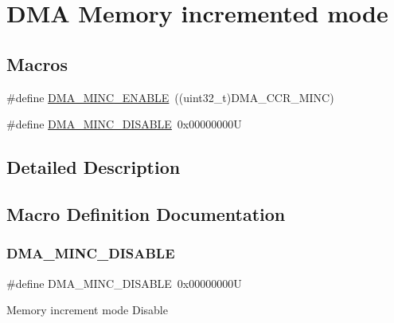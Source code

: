 \hypertarget{group___d_m_a___memory__incremented__mode}{}\section{D\+MA Memory incremented mode}
\label{group___d_m_a___memory__incremented__mode}
\subsection*{Macros}
\begin{DoxyCompactItemize}
\item 
\#define \hyperlink{group___d_m_a___memory__incremented__mode_ga43d30885699cc8378562316ff4fed1cd}{D\+M\+A\+\_\+\+M\+I\+N\+C\+\_\+\+E\+N\+A\+B\+LE}~((uint32\+\_\+t)D\+M\+A\+\_\+\+C\+C\+R\+\_\+\+M\+I\+NC)
\item 
\#define \hyperlink{group___d_m_a___memory__incremented__mode_ga32625330516c188151743473fad97a33}{D\+M\+A\+\_\+\+M\+I\+N\+C\+\_\+\+D\+I\+S\+A\+B\+LE}~0x00000000U
\end{DoxyCompactItemize}


\subsection{Detailed Description}


\subsection{Macro Definition Documentation}
\mbox{\label{group___d_m_a___memory__incremented__mode_ga32625330516c188151743473fad97a33}} 
\subsubsection{\texorpdfstring{D\+M\+A\+\_\+\+M\+I\+N\+C\+\_\+\+D\+I\+S\+A\+B\+LE}{DMA\_MINC\_DISABLE}}
{\footnotesize\ttfamily \#define D\+M\+A\+\_\+\+M\+I\+N\+C\+\_\+\+D\+I\+S\+A\+B\+LE~0x00000000U}

Memory increment mode Disable 

